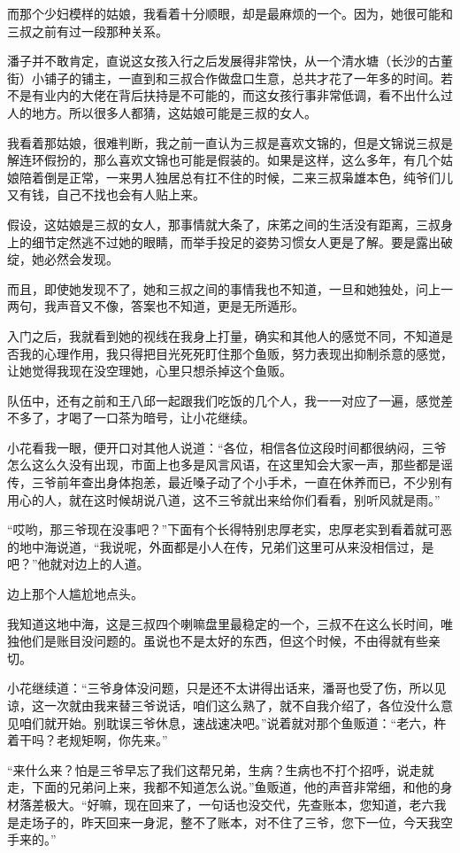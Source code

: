 而那个少妇模样的姑娘，我看着十分顺眼，却是最麻烦的一个。因为，她很可能和三叔之前有过一段那种关系。

潘子并不敢肯定，直说这女孩入行之后发展得非常快，从一个清水塘（长沙的古董街）小铺子的铺主，一直到和三叔合作做盘口生意，总共才花了一年多的时间。若不是有业内的大佬在背后扶持是不可能的，而这女孩行事非常低调，看不出什么过人的地方。所以很多人都猜，这姑娘可能是三叔的女人。

我看着那姑娘，很难判断，我之前一直认为三叔是喜欢文锦的，但是文锦说三叔是解连环假扮的，那么喜欢文锦也可能是假装的。如果是这样，这么多年，有几个姑娘陪着倒是正常，一来男人独居总有扛不住的时候，二来三叔枭雄本色，纯爷们儿又有钱，自己不找也会有人贴上来。

假设，这姑娘是三叔的女人，那事情就大条了，床笫之间的生活没有距离，三叔身上的细节定然逃不过她的眼睛，而举手投足的姿势习惯女人更是了解。要是露出破绽，她必然会发现。

而且，即使她发现不了，她和三叔之间的事情我也不知道，一旦和她独处，问上一两句，我声音又不像，答案也不知道，更是无所遁形。

入门之后，我就看到她的视线在我身上打量，确实和其他人的感觉不同，不知道是否我的心理作用，我只得把目光死死盯住那个鱼贩，努力表现出抑制杀意的感觉，让她觉得我现在没空理她，心里只想杀掉这个鱼贩。

队伍中，还有之前和王八邱一起跟我们吃饭的几个人，我一一对应了一遍，感觉差不多了，才喝了一口茶为暗号，让小花继续。

小花看我一眼，便开口对其他人说道：“各位，相信各位这段时间都很纳闷，三爷怎么这么久没有出现，市面上也多是风言风语，在这里知会大家一声，那些都是谣传，三爷前年查出身体抱恙，最近嗓子动了个小手术，一直在休养而已，不少别有用心的人，就在这时候胡说八道，这不三爷就出来给你们看看，别听风就是雨。”

“哎哟，那三爷现在没事吧？”下面有个长得特别忠厚老实，忠厚老实到看着就可恶的地中海说道，“我说呢，外面都是小人在传，兄弟们这里可从来没相信过，是吧？”他就对边上的人道。

边上那个人尴尬地点头。

我知道这地中海，这是三叔四个喇嘛盘里最稳定的一个，三叔不在这么长时间，唯独他们是账目没问题的。虽说也不是太好的东西，但这个时候，不由得就有些亲切。

小花继续道：“三爷身体没问题，只是还不太讲得出话来，潘哥也受了伤，所以见谅，这一次就由我来替三爷说话，咱们这么熟了，就不自我介绍了，各位没什么意见咱们就开始。别耽误三爷休息，速战速决吧。”说着就对那个鱼贩道：“老六，杵着干吗？老规矩啊，你先来。”

“来什么来？怕是三爷早忘了我们这帮兄弟，生病？生病也不打个招呼，说走就走，下面的兄弟问上来，我都不知道怎么说。”鱼贩道，他的声音非常细，和他的身材落差极大。“好嘛，现在回来了，一句话也没交代，先查账本，您知道，老六我是走场子的，昨天回来一身泥，整不了账本，对不住了三爷，您下一位，今天我空手来的。”

